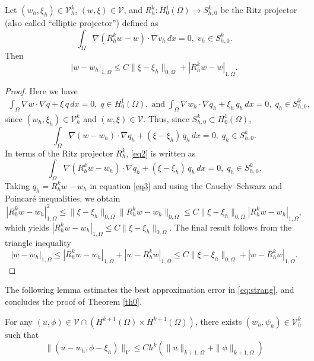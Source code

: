 \documentclass[a4paper,final]{siamltex}
\newcommand{\CV}{\mathcal{V}}
\begin{document}
\begin{lemma}\label{lemma3}
Let $(w_h,\xi_h) \in \CV^k_h$, $(w,\xi)\in  \CV$, and 
$R_h^k:H_0^1(\Omega)\rightarrow S^k_{h,0}$ be 
the Ritz projector (also called ``elliptic projector'') defined as 
\[\int_{\Omega}\nabla (R_h^k w-w)\cdot\nabla v_h\,dx=0,\; v_h \in S^k_{h,0}.
\] 
 Then 
\[ |w-w_h|_{1,\Omega} \leq C \|\xi-\xi_h\|_{0,\Omega}+|R_h^kw-w|_{1,\Omega}. \]
\end{lemma}
\begin{proof}
Here we have \begin{eqnarray*}
\int_{\Omega}\nabla w\cdot\nabla q+\xi\,q\,dx=0,\; q\in H^1_0(\Omega),\;\text{and}\;
\int_{\Omega}\nabla w_h\cdot\nabla q_h+\xi_h\,q_h\,dx=0,\; q_h\in S^k_{h,0},
\end{eqnarray*} 
since $(w_h,\xi_h) \in \CV^k_h$ and $(w,\xi)\in  \CV$.
Thus, since $S_{h,0}^k\subset H^1_0(\Omega)$,
\begin{equation}\label{eq2}
\int_{\Omega}\nabla (w-w_h)\cdot\nabla q_h+(\xi-\xi_h)\,q_h\,dx=0,\; 
q_h\in S^k_{h,0}.
\end{equation}
In terms of the Ritz projector $R_h^k$, \eqref{eq2} is written as 
\begin{equation}\label{eq3}
\int_{\Omega}\nabla (R_h^kw-w_h)\cdot\nabla q_h+(\xi-\xi_h)\,q_h\,dx=0,\; 
q_h\in S^k_{h,0}.
\end{equation}
Taking $q_h = R_h^kw-w_h$ in equation \eqref{eq3} 
and using the Cauchy--Schwarz and Poincar\'e inequalities, we obtain 
\[
|R_h^k w - w_h|^2_{1,\Omega}\leq \|\xi-\xi_h\|_{0,\Omega}\|R_h^k w - w_h\|_{0,\Omega}
\leq C\|\xi-\xi_h\|_{0,\Omega}|R_h^k w - w_h|_{1,\Omega},
\]
which yields $|R_h^k w - w_h|_{1,\Omega}\leq C\|\xi-\xi_h\|_{0,\Omega}$.
The final result follows from the triangle inequality 
\begin{equation*}
|w-w_h|_{1,\Omega}\leq |R_h^k w - w_h|_{1,\Omega}+|w-R_h^kw|_{1,\Omega} \leq 
  C\|\xi-\xi_h\|_{0,\Omega}+ |w-R_h^kw|_{1,\Omega}.
\end{equation*}
\end{proof}

The following lemma estimates the best approximation error in \eqref{eq:strang}, and concludes
the proof of Theorem \ref{th0}.

\begin{lemma}\label{lemma12}
For any $(u,\phi) \in \CV\cap (H^{k+1}(\Omega)\times H^{k+1}(\Omega))$, there exists $(w_h,\psi_h) \in \CV^k_h$ such that
\begin{equation}\label{eq0}
\|(u-w_h,\phi-\xi_h)\|_{V} \leq  Ch^k\left(  \|u\|_{k+1,\Omega} +  \|\phi\|_{k+1,\Omega} \right)
\end{equation}
\end{lemma}
\end{document}
